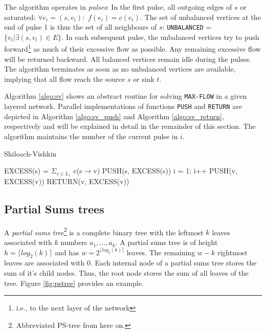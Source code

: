 \documentclass[a4paper,10pt, twocolumn]{article}
\begin{document}
The algorithm operates in \emph{pulses}: In the first pulse, all outgoing edges of $s$ or saturated: $\forall e_i = (s, v_i):$ $f(e_i) = c(e_i)$. The set of unbalanced vertices at the end of pulse 1 is thus the set of all neighbours of $s$: \lstinline|UNBALANCED| = $\{v_i\lvert \exists (s, v_i) \in E \}$. In each subsequent pulse, the unbalanced vertices try to push forward\footnote{i.e., to the next layer of the network} as much of their excessive flow as possible. Any remaining excessive flow will be returned backward. All balanced vertices remain idle during the pulses. The algorithm terminates as soon as no unbalanced vertices are available, implying that all flow reach the source $s$ or sink $t$.

Algorithm \ref{algo:sv} shows an abstract routine for solving \lstinline|MAX-FLOW| in a given layered network. Parallel implementations of functions \lstinline|PUSH| and \lstinline|RETURN| are depicted in Algorithm \ref{algo:sv_push} and Algorithm \ref{algo:sv_return}, respectively and will be explained in detail in the remainder of this section. The algorithm maintains the number of the current pulse in $i$.

\begin{algorithm}
\caption{Shiloach-Vishkin}
\label{algo:sv}
\begin{algorithmic}[1]
		\State EXCESS(s) = $\Sigma_{v \in L_1}$ c(s$\rightarrow$v)
		\State PUSH(s, EXCESS(s))
		i = 1;
			\State i++
					\State PUSH(v, EXCESS(v))
				\EndIf
			\EndFor
			\State RETURN(v, EXCESS(v))
		\EndWhile
	\EndFunction
\end{algorithmic}
\end{algorithm}

\subsection{Partial Sums trees}
\label{sec:sv_pstrees}
A \emph{partial sums tree}\footnote{Abbreviated PS-tree from here on.} is a complete binary tree with the leftmost $k$ leaves associated with $k$ numbers $a_1,...,a_k$. A partial sums tree is of height $h = \lceil log_2(k) \rceil$ and has $w = 2^{\lceil log_2(k) \rceil}$ leaves. The remaining $w - k$ rightmost leaves are associated with 0. Each internal node of a partial sums tree stores the sum of it's child nodes. Thus, the root node stores the sum of all leaves of the tree. Figure \ref{fig:pstree} provides an example.
\end{document}
